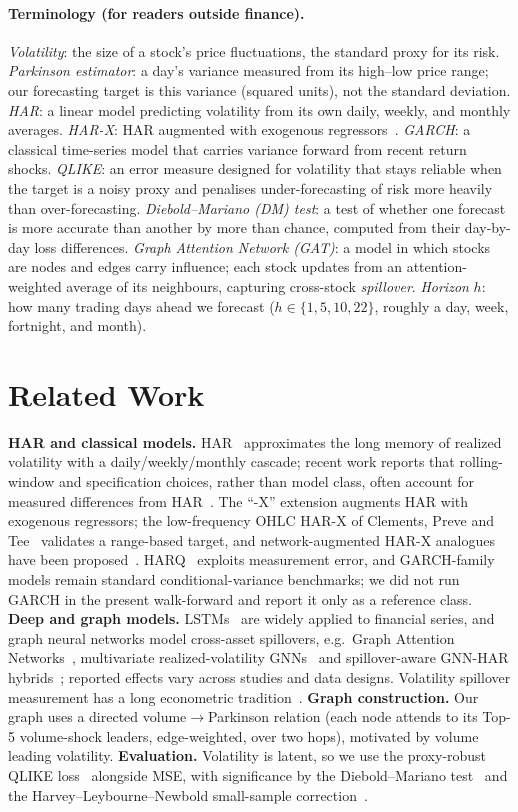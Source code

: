 \documentclass[runningheads]{llncs}
\begin{document}
\paragraph{Terminology (for readers outside finance).}
\emph{Volatility}: the size of a stock's price fluctuations, the standard proxy for its risk.
\emph{Parkinson estimator}: a day's variance measured from its high--low price range; our
forecasting target is this variance (squared units), not the standard deviation.
\emph{HAR}: a linear model predicting volatility from its own daily, weekly, and monthly averages.
\emph{HAR-X}: HAR augmented with exogenous regressors~\cite{corsi2009,clements2024}.
\emph{GARCH}: a classical time-series model that carries variance forward from recent return shocks.
\emph{QLIKE}: an error measure designed for volatility that stays reliable when the target is a noisy
proxy and penalises under-forecasting of risk more heavily than over-forecasting.
\emph{Diebold--Mariano (DM) test}: a test of whether one forecast is more accurate than another by
more than chance, computed from their day-by-day loss differences.
\emph{Graph Attention Network (GAT)}: a model in which stocks are nodes and edges carry influence;
each stock updates from an attention-weighted average of its neighbours, capturing cross-stock
\emph{spillover}.
\emph{Horizon} $h$: how many trading days ahead we forecast ($h\in\{1,5,10,22\}$, roughly a day,
week, fortnight, and month).

\section{Related Work}
\textbf{HAR and classical models.} HAR~\cite{corsi2009} approximates the long memory of realized
volatility with a daily/weekly/monthly cascade; recent work reports that rolling-window and
specification choices, rather than model class, often account for measured differences from
HAR~\cite{audrino2025}. The ``-X'' extension augments HAR with exogenous regressors; the low-frequency
OHLC HAR-X of Clements, Preve and Tee~\cite{clements2024} validates a range-based target, and
network-augmented HAR-X analogues have been proposed~\cite{gnarharx2025}. HARQ~\cite{harq2016}
exploits measurement error, and GARCH-family models remain standard conditional-variance benchmarks;
we did not run GARCH in the present walk-forward and report it only as a reference class.
\textbf{Deep and graph models.} LSTMs~\cite{lstm1997} are widely applied to financial series, and
graph neural networks model cross-asset spillovers, e.g.\ Graph Attention Networks~\cite{gat2018},
multivariate realized-volatility GNNs~\cite{chen2022} and spillover-aware GNN-HAR
hybrids~\cite{gnnhar2025}; reported effects vary across studies and data designs. Volatility spillover
measurement has a long econometric tradition~\cite{dy2012}. \textbf{Graph construction.} Our graph
uses a directed volume$\to$Parkinson relation (each node attends to its Top-5 volume-shock leaders,
edge-weighted, over two hops), motivated by volume leading volatility. \textbf{Evaluation.}
Volatility is latent, so we use the proxy-robust QLIKE loss~\cite{patton2011} alongside MSE, with
significance by the Diebold--Mariano test~\cite{dm1995} and the Harvey--Leybourne--Newbold
small-sample correction~\cite{hln1997}.
\end{document}

